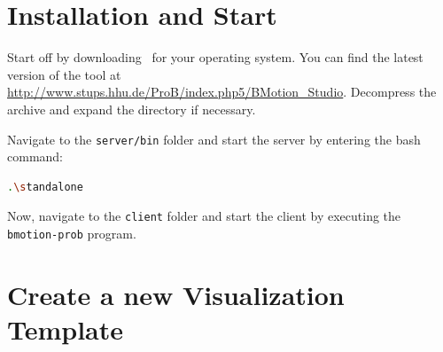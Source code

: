 \section{Installation and Start}
\label{installation}

Start off by downloading \bms~for your operating system. 
You can find the latest version of the tool at \url{http://www.stups.hhu.de/ProB/index.php5/BMotion_Studio}.
Decompress the archive and expand the directory if necessary. 


Navigate to the \texttt{server/bin} folder and start the server by entering the bash command:

\begin{lstlisting}[language=bash]
.\standalone
\end{lstlisting}


Now, navigate to the \texttt{client} folder and start the client by executing the \texttt{bmotion-prob} program.



\section{Create a new Visualization Template}
\label{vis_template}

